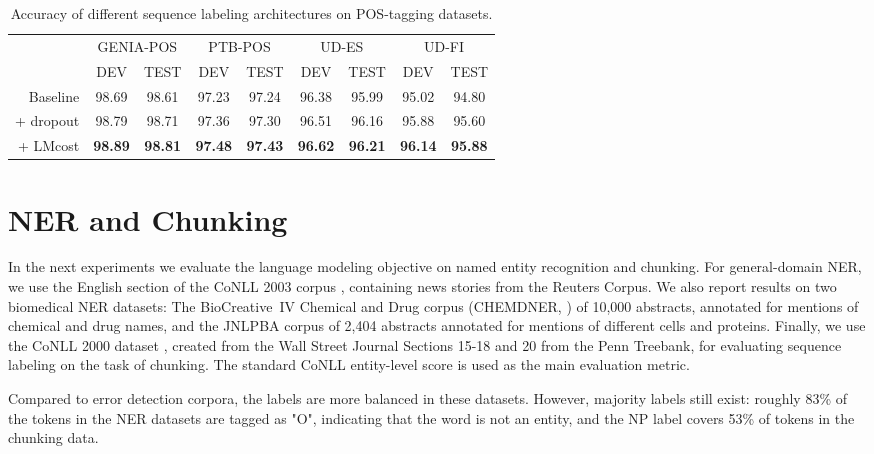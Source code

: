 \documentclass[11pt,a4paper]{article}
\begin{document}
\begin{table*}[t]
\setlength\tabcolsep{11.7pt}
\begin{tabular}{r|cc|cc|cc|cc} \toprule
 & \multicolumn{2}{c|}{GENIA-POS} & \multicolumn{2}{c|}{PTB-POS} & \multicolumn{2}{c|}{UD-ES} & \multicolumn{2}{c}{UD-FI}\\ 
 & {\small DEV} & {\small TEST} & {\small DEV} & {\small TEST} & {\small DEV} & {\small TEST} & {\small DEV} & {\small TEST} \\\midrule
Baseline & 98.69 & 98.61 & 97.23 & 97.24 & 96.38 & 95.99 & 95.02 & 94.80\\
+ dropout & 98.79 & 98.71 & 97.36 & 97.30 & 96.51 & 96.16 & 95.88 & 95.60\\
+ LMcost & \textbf{98.89} & \textbf{98.81} & \textbf{97.48} & \textbf{97.43} & \textbf{96.62} & \textbf{96.21} & \textbf{96.14} & \textbf{95.88} \\ \bottomrule
\end{tabular}
\caption{Accuracy of different sequence labeling architectures on POS-tagging datasets.}
\label{tab:results3}
\end{table*}





\section{NER and Chunking}

In the next experiments we evaluate the language modeling objective on named entity recognition and chunking.
For general-domain NER, we use the English section of the CoNLL 2003 corpus \cite{TjongKimSang2003}, containing news stories from the Reuters Corpus.
We also report results on two biomedical NER datasets: The BioCreative~IV Chemical and Drug corpus (CHEMDNER, ) of 10,000 abstracts, annotated for mentions of chemical and drug names, and the JNLPBA corpus \cite{Kim2004} of 2,404 abstracts annotated for mentions of different cells and proteins.
Finally, we use the CoNLL 2000 dataset \cite{TjongKimSang2000}, created from the Wall Street Journal Sections 15-18 and 20 from the Penn Treebank, for evaluating sequence labeling on the task of chunking.
The standard CoNLL entity-level  score is used as the main evaluation metric.

Compared to error detection corpora, the labels are more balanced in these datasets. However, majority labels still exist:
roughly 83\% of the tokens in the NER datasets are tagged as "O", indicating that the word is not an entity, and the NP label covers 53\% of tokens in the chunking data.
\end{document}
